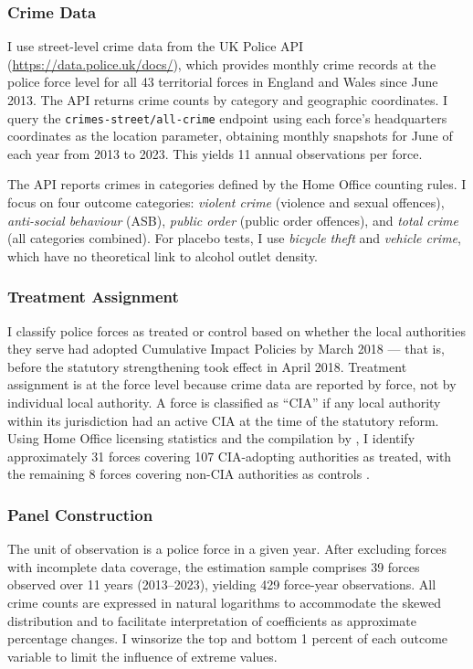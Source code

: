 \documentclass[12pt]{article}
\begin{document}
\subsubsection*{Crime Data} I use street-level crime data from the UK Police API (\url{https://data.police.uk/docs/}), which provides monthly crime records at the police force level for all 43 territorial forces in England and Wales since June 2013. The API returns crime counts by category and geographic coordinates. I query the \texttt{crimes-street/all-crime} endpoint using each force's headquarters coordinates as the location parameter, obtaining monthly snapshots for June of each year from 2013 to 2023. This yields 11 annual observations per force.

The API reports crimes in categories defined by the Home Office counting rules. I focus on four outcome categories: \emph{violent crime} (violence and sexual offences), \emph{anti-social behaviour} (ASB), \emph{public order} (public order offences), and \emph{total crime} (all categories combined). For placebo tests, I use \emph{bicycle theft} and \emph{vehicle crime}, which have no theoretical link to alcohol outlet density.

\subsubsection*{Treatment Assignment} I classify police forces as treated or control based on whether the local authorities they serve had adopted Cumulative Impact Policies by March 2018 --- that is, before the statutory strengthening took effect in April 2018. Treatment assignment is at the force level because crime data are reported by force, not by individual local authority. A force is classified as ``CIA'' if any local authority within its jurisdiction had an active CIA at the time of the statutory reform. Using Home Office licensing statistics and the compilation by \citet{grace2016cumulative}, I identify approximately 31 forces covering 107 CIA-adopting authorities as treated, with the remaining 8 forces covering non-CIA authorities as controls \citep{homeoffice2020licensing}.

\subsubsection*{Panel Construction} The unit of observation is a police force in a given year. After excluding forces with incomplete data coverage, the estimation sample comprises 39 forces observed over 11 years (2013--2023), yielding 429 force-year observations. All crime counts are expressed in natural logarithms to accommodate the skewed distribution and to facilitate interpretation of coefficients as approximate percentage changes. I winsorize the top and bottom 1 percent of each outcome variable to limit the influence of extreme values.
\end{document}

